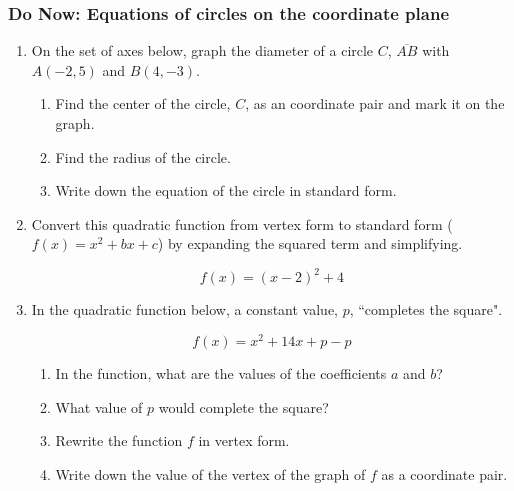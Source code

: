 \documentclass[12pt, twoside]{article}
\begin{document}
\subsubsection*{Do Now: Equations of circles on the coordinate plane}
  \begin{enumerate}

    \item On the set of axes below, graph the diameter of a circle $C$,  $\overline{AB}$ with $A(-2,5)$ and $B(4,-3)$.
      \begin{center} %
      \end{center}
      \begin{enumerate}
        \item Find the center of the circle, $C$, as an coordinate pair and mark it on the graph. \vspace{3cm}
        \item Find the radius of the circle. \vspace{3cm}
        \item Write down the equation of the circle in standard form.
      \end{enumerate}

\newpage


    \item Convert this quadratic function from vertex form to standard form ($f(x)=x^2+bx+c$) by expanding the squared term and simplifying.

        \[f(x) = (x-2)^2+4\]
    \vspace{3cm}

    \item In the quadratic function below, a constant value, $p$, ``completes the square".

    \[f(x) = x^2+14x+p-p\]

    \begin{enumerate}
      \item In the function, what are the values of the coefficients $a$ and $b$?
      \item What value of $p$ would complete the square?
      \item Rewrite the function $f$ in vertex form. \vspace{2cm}
      \item Write down the value of the vertex of the graph of $f$ as a coordinate pair.  \vspace{2cm}
    \end{enumerate}


\end{enumerate}
\end{document}
